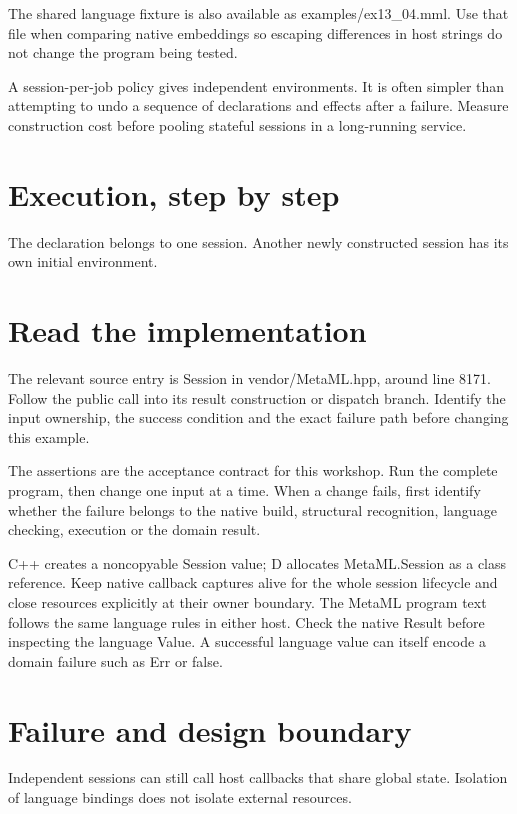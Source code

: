 The shared language fixture is also available as examples/ex13\_04.mml. Use that file when comparing native embeddings so escaping differences in host strings do not change the program being tested.

\clearpage
{}
A session-per-job policy gives independent environments. It is often simpler than attempting to undo a sequence of declarations and effects after a failure. Measure construction cost before pooling stateful sessions in a long-running service.


\section*{Execution, step by step}
The declaration belongs to one session. Another newly constructed session has its own initial environment.

\section*{Read the implementation}
The relevant source entry is Session in vendor/MetaML.hpp, around line 8171. Follow the public call into its result construction or dispatch branch. Identify the input ownership, the success condition and the exact failure path before changing this example.

The assertions are the acceptance contract for this workshop. Run the complete program, then change one input at a time. When a change fails, first identify whether the failure belongs to the native build, structural recognition, language checking, execution or the domain result.

\clearpage
{}
C++ creates a noncopyable Session value; D allocates MetaML.Session as a class reference. Keep native callback captures alive for the whole session lifecycle and close resources explicitly at their owner boundary. The MetaML program text follows the same language rules in either host. Check the native Result before inspecting the language Value. A successful language value can itself encode a domain failure such as Err or false.


\section*{Failure and design boundary}
Independent sessions can still call host callbacks that share global state. Isolation of language bindings does not isolate external resources.

